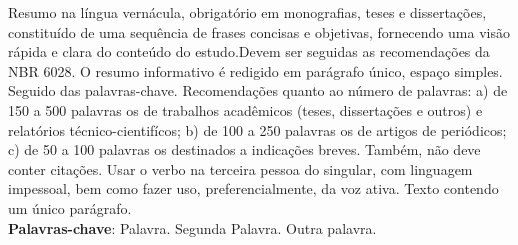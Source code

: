 
\begin{resumo}[RESUMO]
\begin{SingleSpacing}


Resumo na língua vernácula, obrigatório em monografias, teses e dissertações, constituído de uma sequência de frases concisas e objetivas, fornecendo uma visão rápida e clara do conteúdo do estudo.Devem ser seguidas as recomendações da NBR 6028. O resumo informativo é redigido em parágrafo único, espaço simples. Seguido das palavras-chave. Recomendações quanto ao número de palavras: a) de 150 a 500 palavras os de trabalhos acadêmicos (teses, dissertações e outros) e relatórios técnico-cientifícos; b) de 100 a 250 palavras os de artigos de periódicos; c) de 50 a 100 palavras os destinados a indicações breves. Também, não deve conter citações. Usar o verbo na terceira pessoa do singular, com linguagem impessoal, bem como fazer uso, preferencialmente, da voz ativa. Texto contendo um único parágrafo.\\

\textbf{Palavras-chave}: Palavra. Segunda Palavra. Outra palavra.

\end{SingleSpacing}
\end{resumo}


